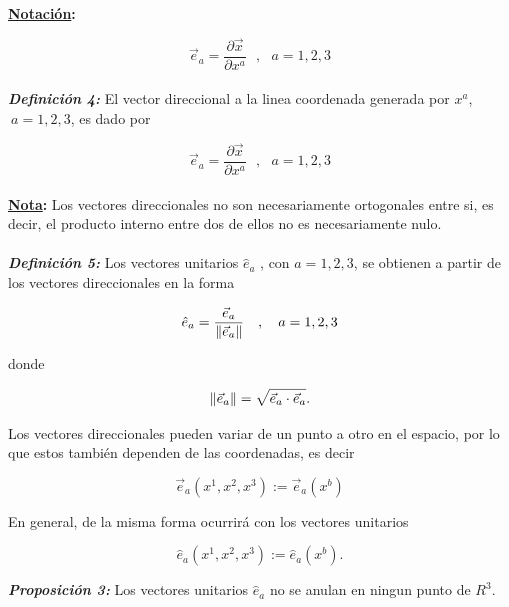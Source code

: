 \documentclass[12pt]{report}
\DeclarePairedDelimiter\norm{\lVert}{\rVert}
\begin{document}
\textbf{\underline{Notación}:}

\begin{equation} \nonumber
\vec{e}_a= \frac{\partial \vec{x}}{\partial x^a} \ \ \ , \ \ \  a=1,2,3 
\end{equation}
\\

\textbf{\textit{Definición 4:}} El vector direccional a la linea coordenada 	generada por $x^a$,$ \ a=1,2,3$, es dado por 


\begin{equation} \label{2.26}
\vec{e}_a= \frac{\partial \vec{x}}{\partial x^a} \ \ \ , \ \ \  a=1,2,3 
\end{equation}
\\


\textbf{\underline{Nota}:} Los vectores direccionales no son necesariamente ortogonales entre si, es decir, el producto interno entre dos de ellos no es necesariamente nulo.\\ \\

\textbf{\textit{Definición 5:}} Los vectores unitarios $\displaystyle\hat{e}_a$ , con $a=1,2,3$, se obtienen a partir de los vectores direccionales en la forma

\begin{equation} \label{2.27}
\hat{e}_a =  \frac{\vec{e}_a}{\norm{\vec{e}_a}} \ \ \ , \ \ \ a=1,2,3
\end{equation}

donde

\begin{equation} \label{2.28}
\norm{\vec{e}_a}= \sqrt{\vec{e}_a \cdot \vec{e}_a}.
\end{equation}

Los vectores direccionales pueden variar de un punto a otro en el espacio, por lo que estos también dependen de las coordenadas, es decir

\begin{equation}  \nonumber
\vec{e}_a(x^1,x^2,x^3):= \vec{e}_a(x^b)
\end{equation}

En general, de la misma forma ocurrirá con los vectores unitarios


\begin{equation} \nonumber
\hat{e}_a(x^1,x^2,x^3):= \hat{e}_a(x^b).
\end{equation}

\textbf{\textit{Proposición 3:}} Los vectores unitarios $\displaystyle\hat{e}_a$ no se anulan en ningun punto de $R^3$. \\ \\
\end{document}
